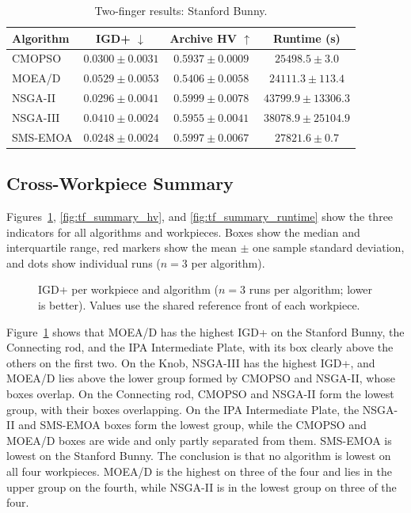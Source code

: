 \begin{table}[htbp]
    \centering
    \caption{Two-finger results: Stanford Bunny.}
    \label{tab:tf_evo_bunny}
    \begin{tabular}{@{}lccc@{}}
        \toprule
        \textbf{Algorithm} & \textbf{IGD+} $\downarrow$ & \textbf{Archive HV} $\uparrow$ & \textbf{Runtime (s)} \\
        \midrule
        CMOPSO   & $0.0300 \pm 0.0031$ & $0.5937 \pm 0.0009$ & $25498.5 \pm 3.0$ \\
        MOEA/D   & $0.0529 \pm 0.0053$ & $0.5406 \pm 0.0058$ & $24111.3 \pm 113.4$ \\
        NSGA-II  & $0.0296 \pm 0.0041$ & {\boldmath$0.5999 \pm 0.0078$} & $43799.9 \pm 13306.3$ \\
        NSGA-III & $0.0410 \pm 0.0024$ & $0.5955 \pm 0.0041$ & $38078.9 \pm 25104.9$ \\
        SMS-EMOA & {\boldmath$0.0248 \pm 0.0024$} & $0.5997 \pm 0.0067$ & $27821.6 \pm 0.7$ \\
        \bottomrule
    \end{tabular}
\end{table}

\subsection{Cross-Workpiece Summary}
\label{subsec:results_tf_summary}

Figures~\ref{fig:tf_summary_igdplus}, \ref{fig:tf_summary_hv}, and \ref{fig:tf_summary_runtime}
show the three indicators for all algorithms and workpieces. Boxes show the median and
interquartile range, red markers show the mean $\pm$ one sample standard deviation, and dots
show individual runs ($n=3$ per algorithm).

\begin{figure}[H]
    \centering
    \caption{IGD+ per workpiece and algorithm ($n=3$ runs per algorithm; lower is better).
    Values use the shared reference front of each workpiece.}
    \label{fig:tf_summary_igdplus}
\end{figure}

Figure~\ref{fig:tf_summary_igdplus} shows that MOEA/D has the highest IGD+ on the Stanford
Bunny, the Connecting rod, and the IPA Intermediate Plate, with its box clearly above the
others on the first two. On the Knob, NSGA-III has the highest IGD+, and MOEA/D lies above
the lower group formed by CMOPSO and NSGA-II, whose boxes overlap. On the Connecting rod,
CMOPSO and NSGA-II form the lowest group, with their boxes overlapping. On the IPA
Intermediate Plate, the NSGA-II and SMS-EMOA boxes form the lowest group, while the CMOPSO
and MOEA/D boxes are wide and only partly separated from them. SMS-EMOA is lowest on the
Stanford Bunny. The conclusion is that no algorithm is lowest on all four workpieces. MOEA/D
is the highest on three of the four and lies in the upper group on the fourth, while NSGA-II
is in the lowest group on three of the four.

